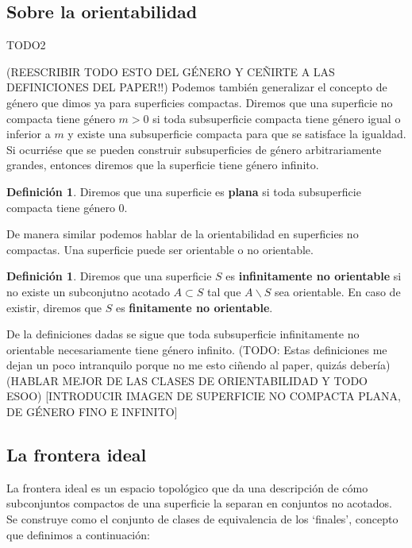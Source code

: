 \documentclass[a4paper,11pt,spanish, twoside, leqno]{tfg-uam}
\theoremstyle{definition}
\newtheorem{defin}[teor]{Definici\'on}
\begin{document}
\subsection{Sobre la orientabilidad}
TODO2

(REESCRIBIR TODO ESTO DEL GÉNERO Y CEÑIRTE A LAS DEFINICIONES DEL PAPER!!)
Podemos también generalizar el concepto de género que dimos ya para superficies compactas. Diremos que una superficie no compacta tiene género $m > 0$ si toda subsuperficie compacta tiene género igual o inferior a $m$ y existe una subsuperficie compacta para que se satisface la igualdad. Si ocurriése que se pueden construir subsuperficies de género arbitrariamente grandes, entonces diremos que la superficie tiene género infinito. 
\begin{defin}
Diremos que una superficie es \textbf{plana} si toda subsuperficie compacta tiene género 0. 
\end{defin}

De manera similar podemos hablar de la orientabilidad en superficies no compactas. Una superficie puede ser orientable o no orientable. 
\begin{defin}
Diremos que una superficie $S$ es \textbf{infinitamente no orientable} si no existe un subconjutno acotado  $A \subset S$ tal que $A\backslash S$ sea orientable. En caso de existir, diremos que $S$ es \textbf{finitamente no orientable}.
\end{defin}
De la definiciones dadas se sigue que toda subsuperficie infinitamente no orientable necesariamente tiene género infinito.
(TODO: Estas definiciones me dejan un poco intranquilo porque no me esto ciñendo al paper, quizás debería)
(HABLAR MEJOR DE LAS CLASES DE ORIENTABILIDAD Y TODO ESOO)
[INTRODUCIR IMAGEN DE SUPERFICIE NO COMPACTA PLANA, DE GÉNERO FINO E INFINITO]
\\

\subsection{La frontera ideal}
La frontera ideal es un espacio topológico que da una descripción de cómo subconjuntos compactos de una superficie la separan en conjuntos no acotados. Se construye como el conjunto de clases de equivalencia de los `finales', concepto que definimos a continuación:
\end{document}
